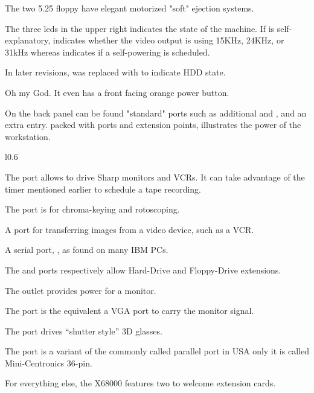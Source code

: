The two 5.25 floppy have elegant motorized "soft" ejection systems.

The three leds in the upper right indicates the state of the machine. If  is self-explanatory,  indicates whether the video output is using 15KHz, 24KHz, or 31kHz whereas  indicates if a self-powering is scheduled. 

In later revisions,  was replaced with  to indicate HDD state.

Oh my God. It even has a front facing orange power button.

On the back panel can be found "standard" ports such as additional  and , and an extra  entry.  packed with ports and extension points, illustrates the power of the workstation.

\pagebreak

\begin{wrapfigure}[35]{l}{0.6\textwidth}
\centering
{}
\end{wrapfigure}



The  port allows to drive Sharp monitors and VCRs. It can take advantage of the timer mentioned earlier to schedule a tape recording.

The  port is for chroma-keying and rotoscoping.

A  port for transferring images from a video device, such as a VCR.

A serial port, , as found on many IBM PCs.



The  and  ports respectively allow Hard-Drive and Floppy-Drive extensions.

The  outlet provides power for a monitor.

The  port is the equivalent a VGA port to carry the monitor signal.


The  port drives “shutter style” 3D glasses.

The  port is a variant of the commonly called parallel port in USA only it is called Mini-Centronics 36-pin. 

For everything else, the X68000 features two  to welcome extension cards.

